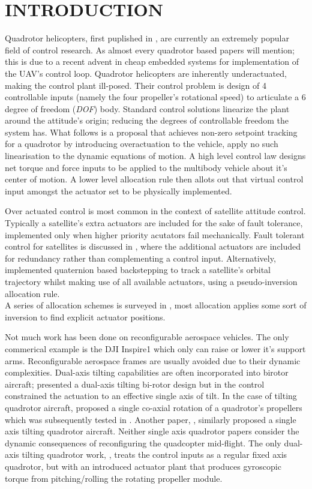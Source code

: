 \documentclass[a4paper, 10pt, conference]{ieeeconf}
\begin{document}
\section{INTRODUCTION}
Quadrotor helicopters, first puplished in \cite{x4flyer}, are currently an extremely popular field of control research. As almost every quadrotor based papers will mention; this is due to a recent advent in cheap embedded systems for implementation of the UAV's control loop. Quadrotor helicopters are inherently underactuated, making the control plant ill-posed. Their control problem is design of 4 controllable inputs (namely the four propeller's rotational speed) to articulate a 6 degree of freedom (\emph{DOF}) body. Standard control solutions linearize the plant around the attitude's origin; reducing the degrees of controllable freedom the system has. What follows is a proposal that achieves non-zero setpoint tracking for a quadrotor by introducing overactuation to the vehicle, apply no such linearisation to the dynamic equations of motion. A high level control law designs net torque and force inputs to be applied to the multibody vehicle about it's center of motion. A lower level allocation rule then allots out that virtual control input amongst the actuator set to be physically implemented.
\par
Over actuated control is most common in the context of satellite attitude control. Typically a satellite's extra actuators are included for the sake of fault tolerance, implemented only when higher priority acutators fail mechanically. Fault tolerant control for satellites is discussed in \cite{ftcallocation}, where the additional actuators are included for redundancy rather than complementing a control input. Alternatively, \cite{quaternionbackstep} implemented quaternion based backstepping to track a satellite's orbital trajectory whilst making use of all available actuators, using a pseudo-inversion allocation rule. 
\\
A series of allocation schemes is surveyed in \cite{allocation}, most allocation applies some sort of inversion to find explicit actuator positions.
\par
Not much work has been done on reconfigurable aerospace vehicles. The only commerical example is the DJI Inspire1 which only can raise or lower it's support arms. Reconfigurable aerospace frames are usually avoided due to their dynamic complexities. Dual-axis tilting capabilities are often incorporated into birotor aircraft; \cite{ggress} presented a dual-axis tilting bi-rotor design but in the control constrained the actuation to an effective single axis of tilt. In the case of tilting quadrotor aircraft, \cite{tiltingmodelling} proposed a single co-axial rotation of a quadrotor's propellers which was subsequently tested in \cite{tiltingtest}. Another paper, \cite{nemati}, similarly proposed a single axis tilting quadrotor aircraft. Neither single axis quadrotor papers consider the dynamic consequences of reconfiguring the quadcopter mid-flight. The only dual-axis tilting quadrotor work, \cite{tiltgasco}, treats the control inputs as a regular fixed axis quadrotor, but with an introduced actuator plant that produces gyroscopic torque from pitching/rolling the rotating propeller module.
\end{document}
